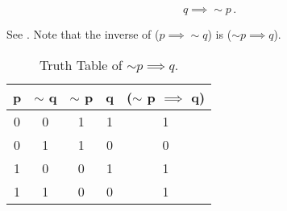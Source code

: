 %
%

\begin{subquestions}
	

\subquestion

\begin{equation}
	q \implies \sim p\,. 
\end{equation}


\subquestion

See . Note that the inverse of ($p \implies \sim q$) is ($\sim p \implies q$).

\begin{table}[ht]
	\centering
	\begin{tabular}{|c|c|c|c|c|}
		\hline
		p & $\sim$ q & $\sim$ p & q & ($\sim$ p $\implies$ q) \\
		\hline
		0 & 0 & 1 & 1 & 1 \\
		0 & 1 & 1 & 0 & 0 \\
		1 & 0 & 0 & 1 & 1 \\
		1 & 1 & 0 & 0 & 1 \\
		\hline
	\end{tabular}
	\caption{\label{2014:q1:tab:Tab1} Truth Table of $\sim p \implies q$.}
\end{table}
		
		

\end{subquestions}
